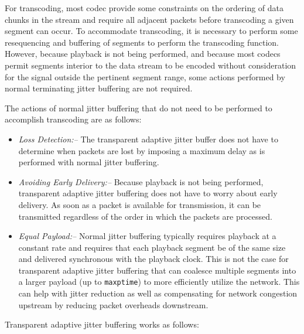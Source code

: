 \documentclass[letterpaper,final,notitlepage,twocolumn,10pt,twoside]{article}
\begin{document}
For transcoding, most codec provide some constraints on the ordering of data
chunks in the stream and require all adjacent packets before transcoding a given
segment can occur.  To accommodate transcoding, it is necessary to perform some
resequencing and buffering of segments to perform the transcoding function.
However, because playback is not being performed, and because most codecs permit
segments interior to the data stream to be encoded without consideration for the
signal outside the pertinent segment range, some actions performed by normal
terminating jitter buffering are not required.

The actions of normal jitter buffering that do not need to be performed to
accomplish transcoding are as follows:

\begin{itemize}

\item{\it Loss Detection:--} The transparent adaptive jitter buffer does not
have to determine when packets are lost by imposing a maximum delay as is
performed with normal jitter buffering.

\item{\it Avoiding Early Delivery:--}  Because playback is not being performed,
transparent adaptive jitter buffering does not have to worry about early
delivery.  As soon as a packet is available for transmission, it can be
transmitted regardless of the order in which the packets are processed.

\item{\it Equal Payload:--}  Normal jitter buffering typically requires playback
at a constant rate and requires that each playback segment be of the same size
and delivered synchronous with the playback clock.  This is not the case for
transparent adaptive jitter buffering that can coalesce multiple segments into a
larger payload (up to {\tt maxptime}) to more efficiently utilize the network.
This can help with jitter reduction as well as compensating for network
congestion upstream by reducing packet overheads downstream.

\end{itemize}

Transparent adaptive jitter buffering works as follows:
\end{document}
